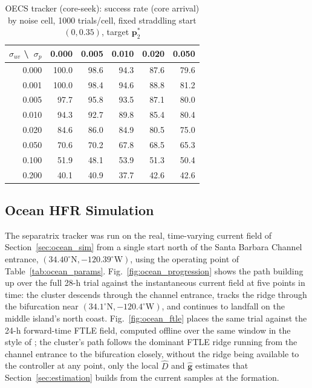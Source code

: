 \documentclass[lettersize,journal]{IEEEtran}
\begin{document}
\begin{table}[!t]
\centering
\caption{OECS tracker (core-seek): success rate (core arrival) by noise
cell, 1000 trials/cell, fixed straddling start $(0, 0.35)$, target
$\mathbf{p}^*_2$}
\label{tab:oecs_success}
\footnotesize
\setlength{\tabcolsep}{4pt}
\begin{tabular}{r|rrrrr}
\hline
$\sigma_{uv}$ \textbackslash\ $\sigma_p$ & 0.000 & 0.005 & 0.010 & 0.020 & 0.050 \\
\hline
0.000 & 100.0 & 98.6 & 94.3 & 87.6 & 79.6 \\
0.001 & 100.0 & 98.4 & 94.6 & 88.8 & 81.2 \\
0.005 &  97.7 & 95.8 & 93.5 & 87.1 & 80.0 \\
0.010 &  94.3 & 92.7 & 89.8 & 85.4 & 80.4 \\
0.020 &  84.6 & 86.0 & 84.9 & 80.5 & 75.0 \\
0.050 &  70.6 & 70.2 & 67.8 & 68.5 & 65.3 \\
0.100 &  51.9 & 48.1 & 53.9 & 51.3 & 50.4 \\
0.200 &  40.1 & 40.9 & 37.7 & 42.6 & 42.6 \\
\hline
\end{tabular}
\end{table}

\subsection{Ocean HFR Simulation}
\label{sec:results_ocean}

The separatrix tracker was run on the real, time-varying current field
of Section~\ref{sec:ocean_sim} from a single start north of the Santa
Barbara Channel entrance, $(34.40^{\circ}\mathrm{N},
-120.39^{\circ}\mathrm{W})$, using the operating point of
Table~\ref{tab:ocean_params}. Fig.~\ref{fig:ocean_progression} shows the
path building up over the full 28-h trial against the instantaneous
current field at five points in time: the cluster descends through the
channel entrance, tracks the ridge through the bifurcation near
$(34.1^{\circ}\mathrm{N}, -120.4^{\circ}\mathrm{W})$, and continues to
landfall on the middle island's north coast. Fig.~\ref{fig:ocean_ftle}
places the same trial against the 24-h forward-time FTLE field, computed
offline over the same window in the style of \cite{17}; the cluster's path
follows the dominant FTLE ridge running from the channel entrance to the
bifurcation closely, without the ridge being available to the controller
at any point, only the local $\hat{D}$ and $\hat{\mathbf{g}}$ estimates
that Section~\ref{sec:estimation} builds from the current samples at the
formation.
\end{document}
